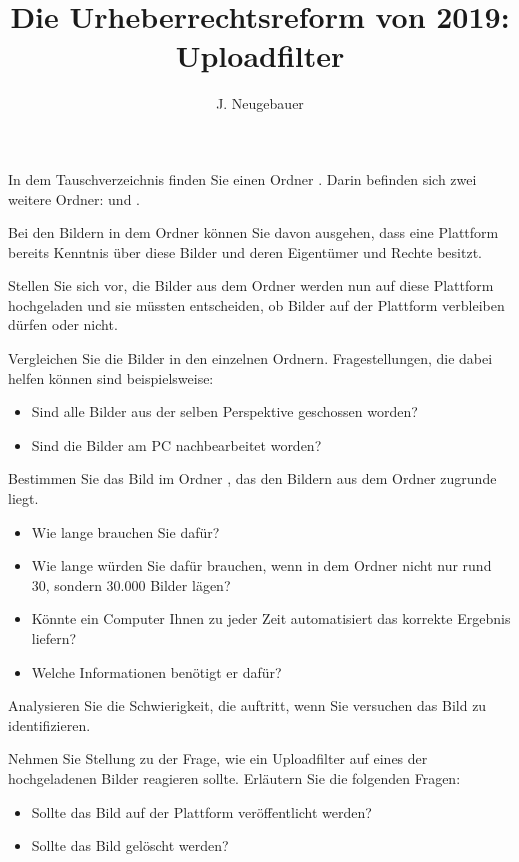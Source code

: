 \documentclass[10pt, a4paper]{scrartcl}
\author{J. Neugebauer}
\title{Die Urheberrechtsreform von 2019: Uploadfilter}
\date{\Heute}
\begin{document}
	\ReiheTitel
	
	In dem Tauschverzeichnis finden Sie einen Ordner . Darin befinden sich zwei weitere Ordner:  und .
	
	Bei den Bildern in dem Ordner  können Sie davon ausgehen, dass eine Plattform bereits Kenntnis über diese Bilder und deren Eigentümer und Rechte besitzt.
	
	Stellen Sie sich vor, die Bilder aus dem Ordner  werden nun auf diese Plattform hochgeladen und sie müssten entscheiden, ob Bilder auf der Plattform verbleiben dürfen oder nicht.
	
	\begin{aufgabe}
	Vergleichen Sie die Bilder in den einzelnen Ordnern. Fragestellungen, die dabei helfen können sind beispielsweise:
	
	\begin{itemize}
		\item Sind alle Bilder aus der selben Perspektive geschossen worden?
		\item Sind die Bilder am PC nachbearbeitet worden?
	\end{itemize}
	\end{aufgabe}
	
	\begin{aufgabe}
	Bestimmen Sie das Bild im Ordner , das den Bildern aus dem Ordner  zugrunde liegt.
	
	\begin{itemize}
		\item Wie lange brauchen Sie dafür?
		\item Wie lange würden Sie dafür brauchen, wenn in dem Ordner nicht nur rund 30, sondern 30.000 Bilder lägen?
		\item Könnte ein Computer Ihnen zu jeder Zeit automatisiert das korrekte Ergebnis liefern?
		\item Welche Informationen benötigt er dafür?
	\end{itemize}
	\end{aufgabe}
	
	\begin{aufgabe}
	Analysieren Sie die Schwierigkeit, die auftritt, wenn Sie versuchen das Bild zu identifizieren.
	\end{aufgabe}
	
	\begin{aufgabe}
	Nehmen Sie Stellung zu der Frage, wie ein Uploadfilter auf eines der hochgeladenen Bilder reagieren sollte. Erläutern Sie die folgenden Fragen:
	
	\begin{itemize}
		\item Sollte das Bild auf der Plattform veröffentlicht werden?
		\item Sollte das Bild gelöscht werden?
	\end{itemize}
	\end{aufgabe}
	
\end{document}
